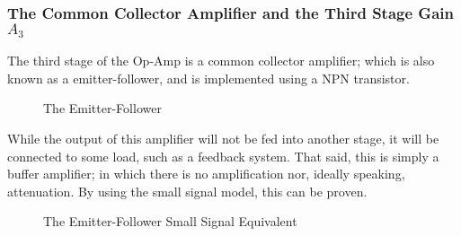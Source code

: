 \documentclass[lettersize,journal]{IEEEtran}
\begin{document}
\subsubsection{The Common Collector Amplifier and the Third Stage Gain $A_3$}
The third stage of the Op-Amp is a common collector amplifier; which is 
also known as a emitter-follower, and is implemented using a NPN transistor.

\begin{figure}[H]
  \centering
  \caption{The Emitter-Follower}
  \label{fig:emitterfollower}
\end{figure}

While the output of this amplifier will not be fed into another stage, 
it will be connected to some load, such as a feedback system.
That said, this is simply a buffer amplifier; in which there is no amplification 
nor, ideally speaking, attenuation. By using the small signal model,
this can be proven.

\IEEEpubidadjcol

\begin{figure}[H]
  \centering
  \caption{The Emitter-Follower Small Signal Equivalent}
  \label{fig:emitterfollowersmallsignal}
\end{figure}
\end{document}
